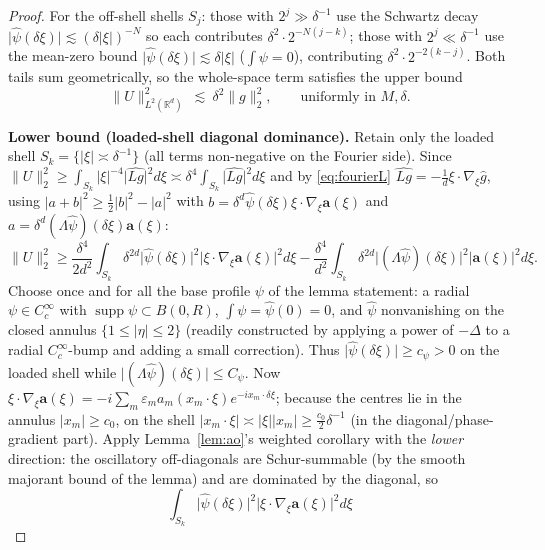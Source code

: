 \documentclass[11pt]{article}
\theoremstyle{remark}
\newcommand{\R}{\mathbb{R}}
\newcommand{\norm}[1]{\lVert #1\rVert}
\newcommand{\abs}[1]{\lvert #1\rvert}
\newcommand{\SET}[1]{\{#1\}}
\DeclareMathOperator{\supp}{supp}
\begin{document}
\begin{proof}
For the off-shell shells $S_j$: those with $2^j\gg\delta^{-1}$ use the
Schwartz decay $\abs{\widehat\psi(\delta\xi)}\lesssim(\delta\abs\xi)^{-N}$
so each contributes $\delta^{2}\cdot 2^{-N(j-k)}$; those with
$2^j\ll\delta^{-1}$ use the mean-zero bound
$\abs{\widehat\psi(\delta\xi)}\lesssim\delta\abs\xi$
($\int\psi=0$), contributing $\delta^{2}\cdot 2^{-2(k-j)}$. Both tails sum
geometrically, so the whole-space term satisfies the upper bound
\begin{equation}\label{eq:Uupper}
\norm{U}_{L^{2}(\R^{d})}^{2}\ \lesssim\ \delta^{2}\norm{g}_{2}^{2},
\qquad\text{uniformly in }M,\delta .
\end{equation}

\noindent\textbf{Lower bound (loaded-shell diagonal dominance).} Retain
only the loaded shell $S_k=\SET{\abs\xi\asymp\delta^{-1}}$ (all terms
non-negative on the Fourier side). Since
$\norm{U}_2^{2}\ge\int_{S_k}\abs\xi^{-4}\abs{\widehat{Lg}}^{2}d\xi
\asymp\delta^{4}\int_{S_k}\abs{\widehat{Lg}}^2d\xi$ and by
\eqref{eq:fourierL} $\widehat{Lg}=-\frac1d\xi\cdot\nabla_\xi\widehat g$,
using $\abs{a+b}^{2}\ge\tfrac12\abs{b}^{2}-\abs{a}^{2}$ with
$b=\delta^{d}\widehat\psi(\delta\xi)\xi\cdot\nabla_\xi\mathbf a(\xi)$ and
$a=\delta^{d}(\Lambda\widehat\psi)(\delta\xi)\mathbf a(\xi)$:
\[
\norm{U}_2^{2}
\ge\frac{\delta^{4}}{2d^{2}}\int_{S_k}\delta^{2d}
\abs{\widehat\psi(\delta\xi)}^{2}\abs{\xi\cdot\nabla_\xi\mathbf a(\xi)}^{2}d\xi
-\frac{\delta^{4}}{d^{2}}\int_{S_k}\delta^{2d}
\abs{(\Lambda\widehat\psi)(\delta\xi)}^{2}\abs{\mathbf a(\xi)}^{2}d\xi .
\]
Choose once and for all the base profile $\psi$ of the lemma
statement: a radial $\psi\in C^\infty_c$ with $\supp\psi\subset B(0,R)$,
$\int\psi=\widehat\psi(0)=0$, and $\widehat\psi$ nonvanishing on the
closed annulus $\SET{1\le\abs\eta\le2}$ (readily constructed by applying a
power of $-\Delta$ to a radial $C^\infty_c$-bump and adding a small
correction). Thus $\abs{\widehat\psi(\delta\xi)}\ge c_\psi>0$ on the
loaded shell while $\abs{(\Lambda\widehat\psi)(\delta\xi)}\le C_\psi$. Now
$\xi\cdot\nabla_\xi\mathbf a(\xi)=-i\sum_m\varepsilon_m a_m(x_m\cdot\xi)
e^{-ix_m\cdot\delta\xi}$; because the centres lie in the annulus
$\abs{x_m}\ge c_0$, on the shell
$\abs{x_m\cdot\xi}\asymp\abs{\xi}\abs{x_m}\ge\tfrac{c_0}{2}\delta^{-1}$ (in
the diagonal/phase-gradient part). Apply Lemma~\ref{lem:ao}'s weighted
corollary with the \emph{lower} direction: the oscillatory off-diagonals
are Schur-summable (by the smooth majorant bound of the lemma) and are
dominated by the diagonal, so
\[
\int_{S_k}\abs{\widehat\psi(\delta\xi)}^{2}
\abs{\xi\cdot\nabla_\xi\mathbf a(\xi)}^{2}d\xi
\]
\end{proof}
\end{document}
